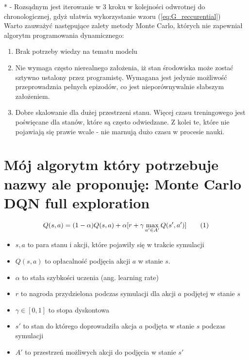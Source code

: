 \documentclass[12pt]{book}
\theoremstyle{plain}
\newcommand\addtag{\refstepcounter{equation}
\renewcommand{\labelenumii}{\theenumii}
\renewcommand{\theenumii}{\theenumi.\arabic{enumii}.}
\tag{\theequation}}
\begin{document}
* - Rozsądnym jest iterowanie w 3 kroku w kolejności odwrotnej do chronologicznej, gdyż ułatwia wykorzystanie wzoru (\ref{eq:G_reccurential})
\\ Warto zauważyć następujące zalety metody Monte Carlo, których nie zapewniał algorytm programowania dynamicznego:
\begin{enumerate}
	\item Brak potrzeby wiedzy na tematu modelu
	\item Nie wymaga często nierealnego założenia, iż stan środowiska może zostać sztywno ustalony przez programistę. Wymagana jest jedynie możliwość przeprowadznia pełnych epizodów, co jest nieporównywalnie słabszym założeniem.
	\item Dobre skalowanie dla dużej przestrzeni stanu. Więcej czasu treningowego jest poświęcane dla stanów, które są często odwiedzane. Z kolei te, które nie pojawiają się prawie wcale - nie marnują dużo czasu w procesie nauki.
\end{enumerate}


\section{Mój algorytm który potrzebuje nazwy ale proponuję: Monte Carlo DQN full exploration} \label{learning:DQN_single_agent}

\[Q(s,a) = (1-\alpha)Q(s,a) + \alpha [r + \gamma \max_{a' \in A'} Q(s',a')] \addtag \label{eq:Q_DQN} \]
\begin{itemize}
	\item $ s,a $ to para stanu i akcji, które pojawiły się w trakcie symulacji
	\item $Q(s,a)$ to opłacalność podjęcia akcji $a$ w stanie $s$.
	\item $\alpha$ to stała szybkości uczenia (ang. learning rate)
	\item $ r $ to nagroda przydzielona podczas symulacji dla akcji $ a $ podjętej w stanie $ s $
	\item $\gamma \in [0,1]$  to stopa dyskontowa
	\item $ s' $ to stan do którego doprowadziła akcja $ a $ podjęta w stanie $ s $ podczas symulacji
	\item $ A' $ to przestrzeń możliwych akcji do podjęcia w stanie $ s' $
\end{itemize}
\end{document}
